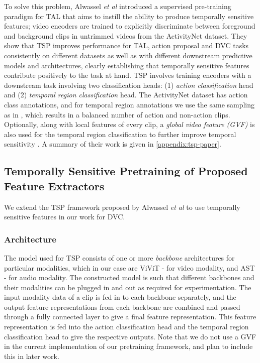 \par To solve this problem, Alwassel \textit{et al} introduced a supervised pre-training paradigm for TAL that aims to instill the ability to produce temporally sensitive features; video encoders are trained to explicitly discriminate between foreground and background clips in untrimmed videos from the ActivityNet dataset. They show that TSP improves performance for TAL, action proposal and DVC tasks consistently on different datasets as well as with different downstream predictive models and architectures, clearly establishing that temporally sensitive features contribute positively to the task at hand. TSP involves training encoders with a downstream task involving two classification heads: (1) \textit{action classification} head and (2) \textit{temporal region classification} head. The ActivityNet dataset has action class annotations, and for temporal region annotations we use the same sampling as in \cite{alwassel2021tsp}, which results in a balanced number of action and non-action clips. Optionally, along with local features of every clip, a \textit{global video feature (GVF)} is also used for the temporal region classification to further improve temporal sensitivity \cite{alwassel2021tsp}. A summary of their work is given in \ref{appendix:tsp-paper}.


\subsection{Temporally Sensitive Pretraining of Proposed Feature Extractors}

\par We extend the TSP framework proposed by Alwassel \textit{et al} \cite{alwassel2021tsp} to use temporally sensitive features in our work for DVC.

\subsubsection{Architecture} The model used for TSP consists of one or more \textit{backbone} architectures for particular modalities, which in our case are ViViT - for video modality, and AST - for audio modality. The constructed model is such that different backbones and their modalities can be plugged in and out as required for experimentation. The input modality data of a clip is fed in to each backbone separately, and the output feature representations from each backbone are combined and passed through a fully connected layer to give a final feature representation. This feature representation is fed into the action classification head and the temporal region classification head to give the respective outputs. Note that we do not use a GVF in the current implementation of our pretraining framework, and plan to include this in later work.

